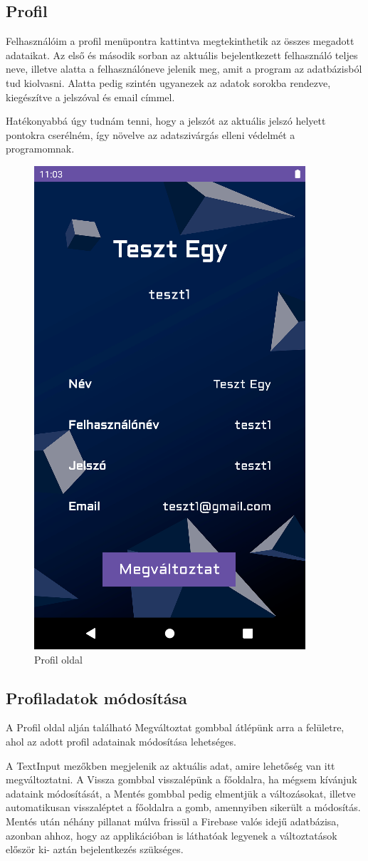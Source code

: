 \documentclass{thesis-ekf}
\begin{document}
\subsection{Profil}
Felhasználóim a profil menüpontra kattintva megtekinthetik az összes megadott adataikat. Az első és második sorban az aktuális bejelentkezett felhasználó teljes neve, illetve alatta a felhasználóneve jelenik meg, amit a program az adatbázisból tud kiolvasni. Alatta pedig szintén ugyanezek az adatok sorokba rendezve, kiegészítve a jelszóval és email címmel.

Hatékonyabbá úgy tudnám tenni, hogy a jelszót az aktuális jelszó helyett pontokra cserélném, így növelve az adatszivárgás elleni védelmét a programomnak.
\begin{figure}[tbh]
	\centering
	\includegraphics[width=0.4\linewidth]{profil}
	\caption{Profil oldal}
	\label{profil}
\end{figure}
\pagebreak

\subsection{Profiladatok módosítása}
A Profil oldal alján található Megváltoztat gombbal átlépünk arra a felületre, ahol az adott profil adatainak módosítása lehetséges. 

A TextInput mezőkben megjelenik az aktuális adat, amire lehetőség van itt megváltoztatni. A Vissza gombbal visszalépünk a főoldalra, ha mégsem kívánjuk adataink módosítását, a Mentés gombbal pedig elmentjük a változásokat, illetve automatikusan visszaléptet a főoldalra a gomb, amennyiben sikerült a módosítás. Mentés után néhány pillanat múlva frissül a Firebase valós idejű adatbázisa, azonban ahhoz, hogy az applikációban is láthatóak legyenek a változtatások először ki- aztán bejelentkezés szükséges.
\end{document}
